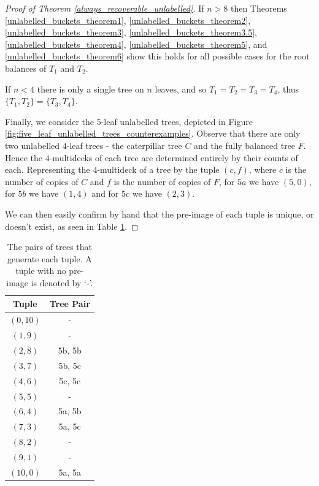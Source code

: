 \documentclass[12pt]{article}
\theoremstyle{definition}
\begin{document}
\begin{proof}[Proof of Theorem \ref{always_recoverable_unlabelled}]
    If $n>8$ then Theorems \ref{unlabelled_buckets_theorem1}, \ref{unlabelled_buckets_theorem2}, \ref{unlabelled_buckets_theorem3}, \ref{unlabelled_buckets_theorem3.5}, \ref{unlabelled_buckets_theorem4}, \ref{unlabelled_buckets_theorem5}, and \ref{unlabelled_buckets_theorem6} show this holds for all possible cases for the root balances of $T_1$ and $T_2$.
    
    If $n < 4$ there is only a single tree on $n$ leaves, and so $T_1=T_2=T_3=T_4$, thus $\{T_1, T_2\}=\{T_3, T_4\}$.

    Finally, we consider the $5$-leaf unlabelled trees, depicted in Figure \ref{fig:five_leaf_unlabelled_trees_counterexamples}. Observe that there are only two unlabelled $4$-leaf trees - the caterpillar tree $C$ and the fully balanced tree $F$. Hence the $4$-multidecks of each tree are determined entirely by their counts of each.  Representing the $4$-multideck of a tree by the tuple $(c,f)$, where $c$ is the number of copies of $C$ and $f$ is the number of copies of $F$, for $5a$ we have $(5,0)$, for $5b$ we have $(1,4)$ and for $5c$ we have $(2,3)$.

    We can then easily confirm by hand that the pre-image of each tuple is unique, or doesn't exist, as seen in Table \ref{f:tuples}.
\end{proof}

\begin{table}
    \centering
    \begin{tabular}{c c}
\textbf{Tuple} & \textbf{Tree Pair} \\
\hline
$(0,10)$ & -\\
$(1,9)$ & -\\
$(2,8)$ & 5b, 5b\\
$(3,7)$ & 5b, 5c\\
$(4,6)$ & 5c, 5c\\
$(5,5)$ & -\\
$(6,4)$ & 5a, 5b\\
$(7,3)$ & 5a, 5c\\
$(8,2)$ & -\\
$(9,1)$ & -\\
$(10,0)$ & 5a, 5a\\
\end{tabular}
\caption{The pairs of trees that generate each tuple. A tuple with no pre-image is denoted by `-'.}
\label{f:tuples}
\end{table}
\end{document}
